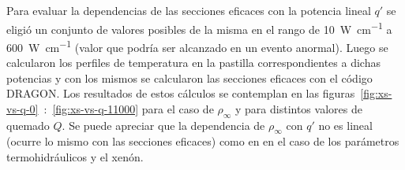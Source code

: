 \documentclass[11pt]{article}
\begin{document}
Para evaluar la dependencias de las secciones eficaces con la potencia lineal $q\prime$ se eligió un conjunto de valores posibles de la misma en el rango de \num{10}~\si{\watt.\centi\meter^{-1}} a  \num{600}~\si{\watt.\centi\meter^{-1}} (valor que podría ser alcanzado en un evento anormal). Luego se calcularon los perfiles de temperatura en la pastilla correspondientes a dichas potencias y con los mismos se calcularon las secciones eficaces con el código DRAGON. Los resultados de estos cálculos se contemplan en las figuras~\ref{fig:xs-vs-q-0}~:~\ref{fig:xs-vs-q-11000} para el caso de $\rho_{\infty}$ y para distintos valores de quemado $Q$. Se puede apreciar que la dependencia de $\rho_{\infty}$ con $q\prime$ no es lineal (ocurre lo mismo con las secciones eficaces) como en en el caso de los parámetros termohidráulicos y el xenón.
\end{document}
